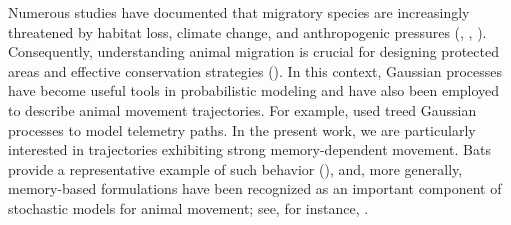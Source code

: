 \documentclass[preprint,12pt,authoryear]{elsarticle}
\begin{document}







Numerous studies have documented that migratory species are increasingly threatened by habitat loss, climate change, and anthropogenic pressures (\cite{Harris2009}, \cite{Williams2021}, \cite{LezamaOchoa2024}). Consequently, understanding animal migration is crucial for designing protected areas and effective conservation strategies (\cite{Runge2014}). In this context, Gaussian processes have become useful tools in probabilistic modeling and have also been employed to describe animal movement trajectories. For example, \cite{Rieber} used treed Gaussian processes to model telemetry paths. In the present work, we are particularly interested in trajectories exhibiting strong memory-dependent movement. Bats provide a representative example of such behavior (\cite{Sarel2017}), and, more generally, memory-based formulations have been recognized as an important component of stochastic models for animal movement; see, for instance, \cite{Smouseetal}.
\end{document}
